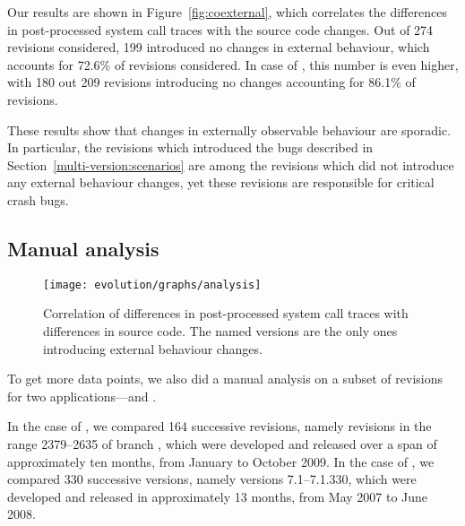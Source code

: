 Our results are shown in Figure~\ref{fig:coexternal}, which correlates the
differences in post-processed system call traces with the source code changes.
Out of 274 \lighttpd revisions considered, 199 introduced no changes in
external behaviour, which accounts for 72.6\% of revisions considered. In case
of \lighttpdtwo, this number is even higher, with 180 out 209 revisions
introducing no changes accounting for 86.1\% of revisions. %

These results show that changes in externally observable behaviour are
sporadic. In particular, the revisions which introduced the bugs described in
Section~\ref{multi-version:scenarios} are among the revisions which did not
introduce any external behaviour changes, yet these revisions are responsible
for critical crash bugs.

\subsection{Manual analysis}

\begin{figure}[t]
  \begin{center}
    \texttt{[image: evolution/graphs/analysis]}
    \caption{Correlation of differences in post-processed system call traces
      with differences in source code. The named versions are the only ones
      introducing external behaviour changes.}
    \label{fig:coanalysis}
  \end{center}
\end{figure}

To get more data points, we also did a manual analysis on a subset of revisions
for two applications---\lighttpd and \vim.

In the case of \lighttpd, we compared 164 successive revisions, namely revisions in
the range 2379--2635 of branch , which were developed
and released over a span of approximately ten months, from January to October
2009. In the case of \vim, we compared 330 successive versions, namely versions
7.1--7.1.330, which were developed and released in approximately 13 months,
from May 2007 to June 2008.


